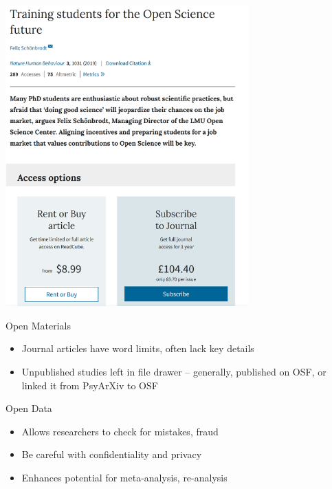 \documentclass[
  ignorenonframetext,
  aspectratio=169,
]{beamer}
\providecommand{\tightlist}{%
  \setlength{\itemsep}{0pt}\setlength{\parskip}{0pt}}\usepackage{longtable,booktabs,array}
\begin{document}
\begin{frame}{}
\label{section-1}
\begin{center}
\includegraphics[width=0.7\textwidth,height=\textheight]{figs/paid-os.png}
\end{center}
\end{frame}

\begin{frame}{Open Materials}
\label{open-materials}
\begin{itemize}
\tightlist
\item
  Journal articles have word limits, often lack key details
\item
  Unpublished studies left in file drawer -- generally, published on
  OSF, or linked it from PsyArXiv to OSF
\end{itemize}
\end{frame}

\begin{frame}{Open Data}
\label{open-data}
\begin{itemize}
\tightlist
\item
  Allows researchers to check for mistakes, fraud
\item
  Be careful with confidentiality and privacy
\item
  Enhances potential for meta-analysis, re-analysis
\end{itemize}
\end{frame}
\end{document}
